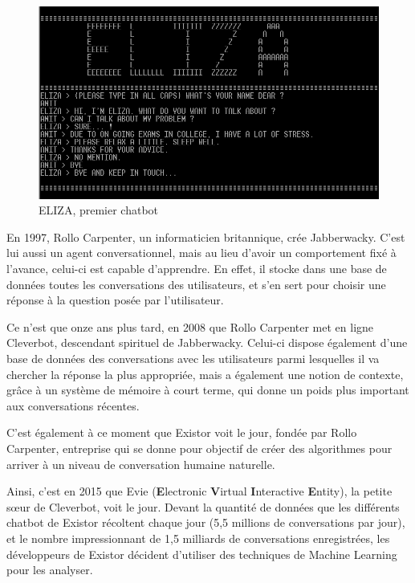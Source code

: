 \documentclass[a4paper, 12pt]{article} %
\begin{document}
\begin{figure}[!h]%
	\begin{center} 
		\includegraphics[width=0.50\columnwidth]{images/eliza.png}%
		\caption{ELIZA, premier chatbot}%
	\end{center}
\end{figure}

En 1997, Rollo Carpenter, un informaticien britannique, crée Jabberwacky. C’est lui aussi un agent conversationnel, mais au lieu d’avoir un comportement fixé à l'avance, celui-ci est capable d’apprendre. En effet, il stocke dans une base de données toutes les conversations des utilisateurs, et s’en sert pour choisir une réponse à la question posée par l’utilisateur.

Ce n’est que onze ans plus tard, en 2008 que Rollo Carpenter met en ligne Cleverbot\cite{carpenter2011cleverbot}, descendant spirituel de Jabberwacky. Celui-ci dispose également d’une base de données des conversations avec les utilisateurs parmi lesquelles il va chercher la réponse la plus appropriée, mais a également une notion de contexte, grâce à un système de mémoire à court terme, qui donne un poids plus important aux conversations récentes.


C'est également à ce moment que Existor voit le jour, fondée par Rollo Carpenter, entreprise qui se donne pour objectif de créer des algorithmes pour arriver à un niveau de conversation humaine naturelle.

Ainsi, c’est en 2015 que Evie (\textbf{E}lectronic \textbf{V}irtual \textbf{I}nteractive \textbf{E}ntity), la petite sœur de Cleverbot, voit le jour. Devant la quantité de données que les différents chatbot de Existor récoltent chaque jour (5,5 millions de conversations par jour), et le nombre impressionnant de 1,5 milliards de conversations enregistrées, les développeurs de Existor décident d'utiliser des techniques de Machine Learning pour les analyser. 
\end{document}
